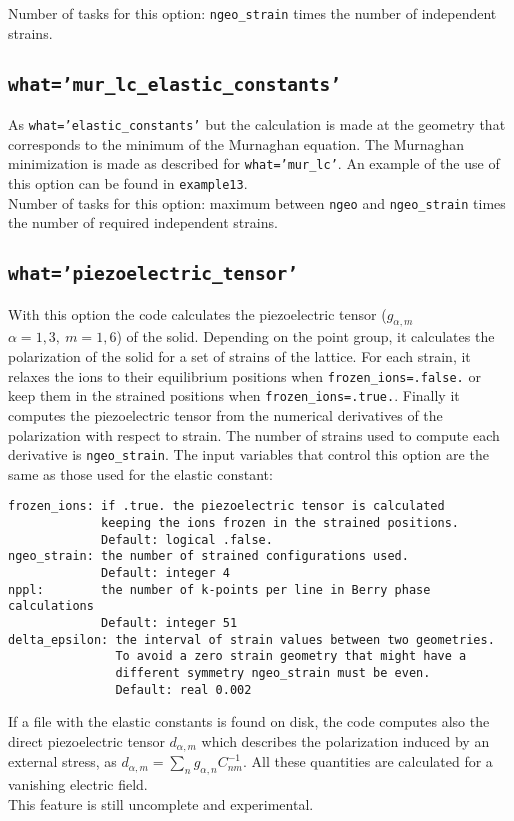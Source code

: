 \documentclass[12pt,a4paper]{article}
\begin{document}
Number of tasks for this option: \texttt{ngeo\_strain} times the number of
independent strains. \\

\subsection{\texttt{what='mur\_lc\_elastic\_constants'}}
As \texttt{what='elastic\_constants'} but the calculation is made at the
geometry that corresponds to the minimum of the Murnaghan equation. The
Murnaghan minimization is made as described for \texttt{what='mur\_lc'}.
An example of the use of this option can be found in \texttt{example13}. \\
Number of tasks for this option: maximum between \texttt{ngeo} and
\texttt{ngeo\_strain} times the number of required independent strains.

\subsection{\texttt{what='piezoelectric\_tensor'}}
With this option the code calculates the piezoelectric tensor 
($g_{\alpha,m}$ $\alpha=1,3,\ m=1,6$) of the solid.
Depending on the point group, it calculates the polarization of the
solid for a set of strains of the lattice. For each strain, it relaxes 
the ions to their equilibrium positions when \texttt{frozen\_ions=.false.} 
or keep them in the strained positions when \texttt{frozen\_ions=.true.}. 
Finally it computes the piezoelectric tensor from the numerical derivatives 
of the polarization with respect to strain.
The number of strains used to compute each derivative is \texttt{ngeo\_strain}. The input variables
that control this option are the same as those used for the elastic constant:
\begin{verbatim}
frozen_ions: if .true. the piezoelectric tensor is calculated 
             keeping the ions frozen in the strained positions. 
             Default: logical .false.
ngeo_strain: the number of strained configurations used. 
             Default: integer 4
nppl:        the number of k-points per line in Berry phase calculations
             Default: integer 51
delta_epsilon: the interval of strain values between two geometries.
               To avoid a zero strain geometry that might have a
               different symmetry ngeo_strain must be even.
               Default: real 0.002
\end{verbatim}
If a file with the elastic constants is found on disk, the code computes also
the direct piezoelectric tensor $d_{\alpha,m}$ which describes
the polarization induced by an external stress, as $d_{\alpha,m}=
\sum_n g_{\alpha,n} C_{nm}^{-1}$. All these quantities are calculated 
for a vanishing electric field. \\
This feature is still uncomplete and experimental.
\end{document}
